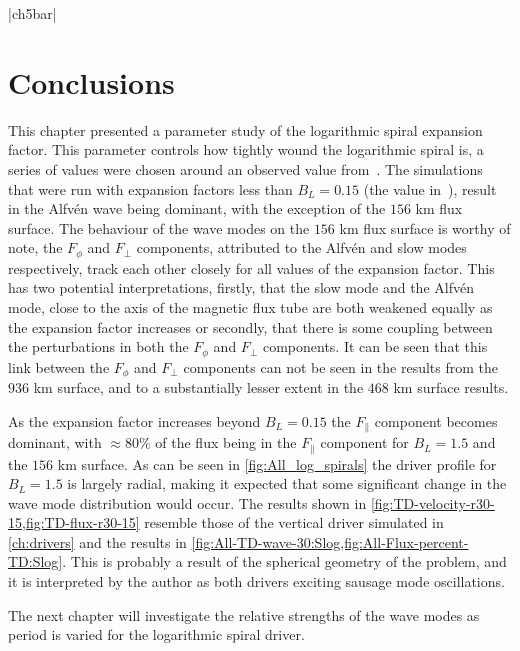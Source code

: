 \py[chapter5]|ch5bar|

\section{Conclusions}

This chapter presented a parameter study of the logarithmic spiral expansion factor.
This parameter controls how tightly wound the logarithmic spiral is, a series of values were chosen around an observed value from~\cite{bonet2008}.
The simulations that were run with expansion factors less than $B_L=0.15$ (the value in~\cite{bonet2008}), result in the Alfv\'en wave being dominant, with the exception of the $156$ km flux surface.
The behaviour of the wave modes on the $156$ km flux surface is worthy of note, the $F_\phi$ and $F_\perp$ components, attributed to the Alfv\'en and slow modes respectively, track each other closely for all values of the expansion factor.
This has two potential interpretations, firstly, that the slow mode and the Alfv\'en mode, close to the axis of the magnetic flux tube are both weakened equally as the expansion factor increases or secondly, that there is some coupling between the perturbations in both the $F_\phi$ and $F_\perp$ components.
It can be seen that this link between the $F_\phi$ and $F_\perp$ components can not be seen in the results from the $936$ km surface, and to a substantially lesser extent in the $468$ km surface results.

As the expansion factor increases beyond $B_L=0.15$ the $F_\parallel$ component becomes dominant, with $\approx 80$\% of the flux being in the $F_\parallel$ component for $B_L=1.5$ and the $156$ km surface.
As can be seen in \cref{fig:All_log_spirals} the driver profile for $B_L=1.5$ is largely radial, making it expected that some significant change in the wave mode distribution would occur.
The results shown in \cref{fig:TD-velocity-r30-15,fig:TD-flux-r30-15} resemble those of the vertical driver simulated in \cref{ch:drivers} and the results in \cref{fig:All-TD-wave-30:Slog,fig:All-Flux-percent-TD:Slog}.
This is probably a result of the spherical geometry of the problem, and it is interpreted by the author as both drivers exciting sausage mode oscillations.


The next chapter will investigate the relative strengths of the wave modes as period is varied for the logarithmic spiral driver.
